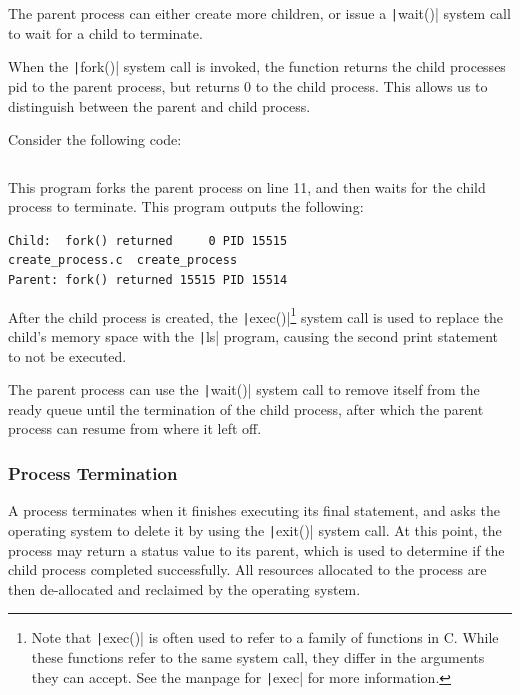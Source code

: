 \documentclass{article}
\begin{document}
The parent process can either create more children, or issue a
\texttt|wait()| system call to wait for a child to terminate.

When the \texttt|fork()| system call is invoked, the function
returns the child processes pid to the parent process, but returns 0 to
the child process. This allows us to distinguish between the parent and
child process.

Consider the following code: \inputminted{c}{code/create_process.c}
This program forks the parent process on line 11, and then waits for
the child process to terminate. This program outputs the following:
\begin{verbatim}
Child:  fork() returned     0 PID 15515
create_process.c  create_process
Parent: fork() returned 15515 PID 15514
\end{verbatim}
After the child process is created, the
\texttt|exec()|\footnote{Note that \texttt|exec()|
is often used to refer to a family of functions in C. While these
functions refer to the same system call, they differ in the arguments
they can accept. See the manpage for \texttt|exec| for more
information.} system call is used to replace the child's memory space
with the \texttt|ls| program, causing the second print
statement to not be executed.

The parent process can use the \texttt|wait()| system call to
remove itself from the ready queue until the termination of the child
process, after which the parent process can resume from where it left
off.
\subsubsection{Process Termination}
A process terminates when it finishes executing its final statement,
and asks the operating system to delete it by using the
\texttt|exit()| system call. At this point, the process may
return a status value to its parent, which is used to determine if the
child process completed successfully. All resources allocated to the
process are then de-allocated and reclaimed by the operating system.
\end{document}

